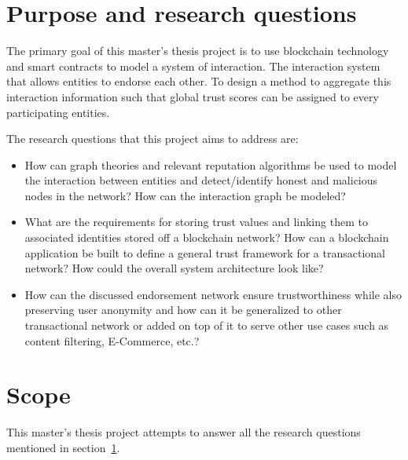 \section{Purpose and research questions} \label{ResearchQuestions}
The primary goal of this master's thesis project is to use blockchain
technology and smart contracts to model a system of interaction. The
interaction system that allows entities to endorse each other. To design a
method to aggregate this interaction information such that global trust scores
can be assigned to every participating entities. \par
The research questions that this project aims to address are: 
\begin{itemize}
		\item How can graph theories and relevant reputation algorithms be used
			to model the interaction between entities and detect/identify
			honest and malicious nodes in the network? How can the interaction
			graph be modeled? \label{question1}
		\item What are the requirements for storing trust values and linking
			them to associated identities stored off a blockchain network? How
			can a blockchain application be built to define a general trust
			framework for a transactional network? How could the overall system
			architecture look like? \label{question2} 
		\item How can the discussed endorsement network ensure trustworthiness
			while also preserving user anonymity and how can it be generalized
			to other transactional network or added on top of it to serve other
			use cases such as content filtering, E-Commerce,
			etc.?\label{question3} 
\end{itemize}
\section{Scope} 
This master's thesis project attempts to answer all the research questions
mentioned in section~\ref{ResearchQuestions}.  
